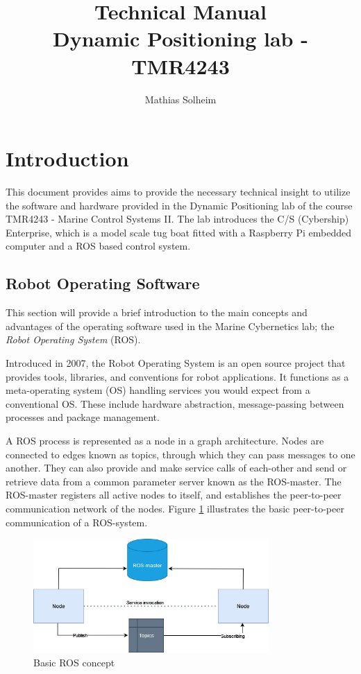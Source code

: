 \documentclass{ol-softwaremanual}
\title{Technical Manual \\Dynamic Positioning lab - TMR4243}
\author{Mathias Solheim}
\begin{document}
\maketitle

\tableofcontents
\listoflistings
\newpage

\section{Introduction}

This document provides aims to provide the necessary technical insight to utilize the software and hardware provided in the Dynamic Positioning lab of the course TMR4243 - Marine Control Systems II. The lab introduces the C/S (Cybership) Enterprise, which is a model scale tug boat fitted with a Raspberry Pi embedded computer and a ROS based control system. 


\subsection{Robot Operating Software}

This section will provide a brief introduction to the main concepts and advantages of the operating software used in the Marine Cybernetics lab; the \textit{Robot Operating System} (ROS).

Introduced in 2007, the Robot Operating System is an open source project that provides tools, libraries, and conventions for robot applications. It functions as a meta-operating system (OS)  handling services you would expect from a conventional OS. These include hardware abstraction, message-passing between processes and package management. 

A ROS process is represented as a node in a graph architecture. Nodes are connected to edges known as topics, through which they can pass messages to one another. They can also provide and make service calls of each-other and send or retrieve data from a common parameter server known as the ROS-master. The ROS-master registers all active nodes to itself, and establishes the peer-to-peer communication network of the nodes. Figure \ref{fig:ros-arch} illustrates the basic peer-to-peer communication of a ROS-system.


\begin{figure}[h]
    \centering
    \includegraphics[width=0.8\textwidth]{ROS-diag.png}
    \caption{Basic ROS concept}
    \label{fig:ros-arch}
\end{figure}
\end{document}
